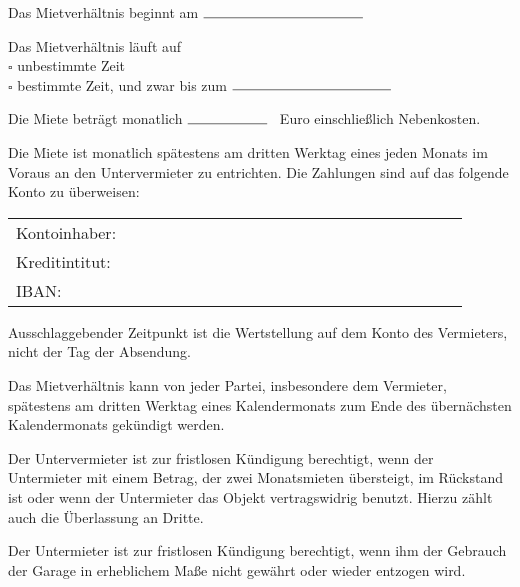 \documentclass[a4paper]{scrartcl}
\begin{document}

Das Mietverhältnis beginnt am $\rule{4cm}{0.15mm}$ \vspace{3mm}

\noindent
Das Mietverhältnis läuft auf \vspace{2mm}\\
$\square$ unbestimmte Zeit\\
$\square$ bestimmte Zeit, und zwar bis zum $\rule{4cm}{0.15mm}$



Die Miete beträgt monatlich $\rule{2cm}{0.15mm}$ \ Euro einschließlich Nebenkosten. \vspace{3mm}

\noindent
Die Miete ist monatlich spätestens am dritten Werktag eines jeden Monats im Voraus an 
den Untervermieter zu entrichten. Die Zahlungen sind auf das folgende Konto zu überweisen:
\vspace{3mm}\\
\begin{tabular}{p{0.2\linewidth}p{0.7\linewidth}}
	Kontoinhaber:&\hrulefill
	
	\\
	
	Kreditintitut:&\hrulefill
	
	\\
	
	IBAN:&\hrulefill
\end{tabular}\vspace{3mm}


\noindent
Ausschlaggebender Zeitpunkt ist die Wertstellung auf dem Konto des Vermieters, nicht der Tag der Absendung.


Das Mietverhältnis kann von jeder Partei, insbesondere dem Vermieter, spätestens am dritten Werktag eines Kalendermonats zum Ende des übernächsten Kalendermonats gekündigt werden.
\vspace{3mm}

\noindent
Der Untervermieter ist zur fristlosen Kündigung berechtigt, wenn der Untermieter mit einem Betrag, der zwei Monatsmieten
übersteigt, im Rückstand ist oder wenn der Untermieter das Objekt vertragswidrig benutzt. Hierzu zählt auch die 
Überlassung an Dritte. 
\vspace{3mm}

\noindent
Der Untermieter ist zur fristlosen Kündigung berechtigt, wenn ihm der Gebrauch der Garage in erheblichem Maße 
nicht gewährt oder wieder entzogen wird.
\end{document}
